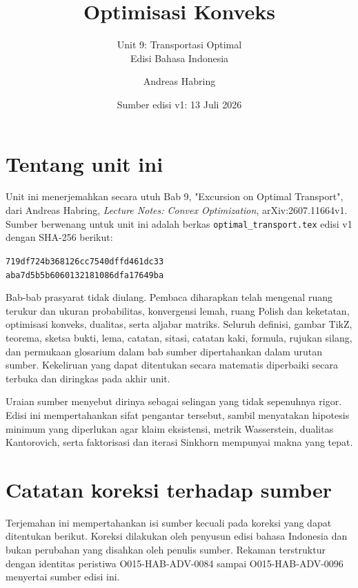 \documentclass[indonesian]{shinybook}
\title{Optimisasi Konveks}
\subtitle{Unit 9: Transportasi Optimal\\Edisi Bahasa Indonesia}
\author{Andreas Habring}
\date{Sumber edisi v1: 13 Juli 2026}
\begin{document}
\maketitle

\frontmatter
\chapter*{Tentang unit ini}
Unit ini menerjemahkan secara utuh Bab 9, "Excursion on Optimal Transport", dari Andreas Habring, \emph{Lecture Notes: Convex Optimization}, arXiv:2607.11664v1. Sumber berwenang untuk unit ini adalah berkas \texttt{optimal\_transport.tex} edisi v1 dengan SHA-256 berikut:
\begin{center}
\small\texttt{719df724b368126cc7540dffd461dc33}\\[-0.2em]
\texttt{aba7d5b5b6060132181086dfa17649ba}
\end{center}

Bab-bab prasyarat tidak diulang. Pembaca diharapkan telah mengenal ruang terukur dan ukuran probabilitas, konvergensi lemah, ruang Polish dan keketatan, optimisasi konveks, dualitas, serta aljabar matriks. Seluruh definisi, gambar TikZ, teorema, sketsa bukti, lema, catatan, sitasi, catatan kaki, formula, rujukan silang, dan permukaan glosarium dalam bab sumber dipertahankan dalam urutan sumber. Kekeliruan yang dapat ditentukan secara matematis diperbaiki secara terbuka dan diringkas pada akhir unit.

Uraian sumber menyebut dirinya sebagai selingan yang tidak sepenuhnya rigor. Edisi ini mempertahankan sifat pengantar tersebut, sambil menyatakan hipotesis minimum yang diperlukan agar klaim eksistensi, metrik Wasserstein, dualitas Kantorovich, serta faktorisasi dan iterasi Sinkhorn mempunyai makna yang tepat.

\tableofcontents

\setcounter{chapter}{6}
\label{chapter:duality}

\mainmatter
\setcounter{chapter}{8}


\backmatter
\printbibliography[heading=bibintoc,title={Daftar pustaka}]

\chapter*{Catatan koreksi terhadap sumber}
Terjemahan ini mempertahankan isi sumber kecuali pada koreksi yang dapat ditentukan berikut. Koreksi dilakukan oleh penyusun edisi bahasa Indonesia dan bukan perubahan yang disahkan oleh penulis sumber. Rekaman terstruktur dengan identitas peristiwa O015-HAB-ADV-0084 sampai O015-HAB-ADV-0096 menyertai sumber edisi ini.
\end{document}
